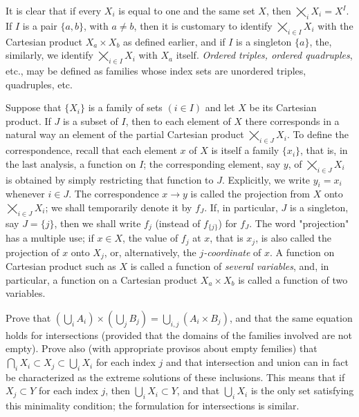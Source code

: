 It is clear that if every $X_{i}$ is equal to one and the same set $X$, then $\bigtimes_{i}X_{i} = X^{I}$. If $I$ is a pair $\{ a,b \}$, with $a \neq b$, then it is customary to identify $\bigtimes_{i \in I}X_{i}$ with the Cartesian product $X_{a} \times X_{b}$ as defined earlier, and if $I$ is a singleton $\{ a \}$, the, similarly, we identify $\bigtimes_{i \in I}X_{i}$ with $X_{a}$ itself. \textit{Ordered triples, ordered quadruples}, etc., may be defined as families whose index sets are unordered triples, quadruples, etc. 

Suppose that $\{ X_{i} \}$ is a family of sets $(i \in I)$ and let $X$ be its Cartesian product. If $J$ is a subset of $I$, then to each element of $X$ there corresponds in a natural way an element of the partial Cartesian product $\bigtimes_{i \in J}X_{i}$. To define the correspondence, recall that each element $x$ of $X$ is itself a family $\{ x_{i} \}$, that is, in the last analysis, a function on $I$; the corresponding element, say $y$, of $\bigtimes_{i \in J}X_{i}$ is obtained by simply restricting that function to $J$. Explicitly, we write $y_{i} = x_{i}$ whenever $i \in J$. The correspondence $x \rightarrow y$ is called the projection from $X$ onto $\bigtimes_{i \in J}X_{i}$; we shall temporarily denote it by $f_{J}$. If, in particular, $J$ is a singleton, say $J = \{ j \}$, then we shall write $f_{j}$ (instead of $f_{ \{j \} }$) for $f_{J}$. The word "projection" has a multiple use; if $x \in X$, the value of $f_{j}$ at $x$, that is $x_{j}$, is also called the projection of $x$ onto $X_{j}$, or, alternatively, the \textit{$j$-coordinate} of $x$. A function on Cartesian product such as $X$ is called a function of \textit{several variables}, and, in particular, a function on a Cartesian product $X_{a} \times X_{b}$ is called a function of two variables. 

\begin{exercise} Prove that $(\bigcup_{i}A_{i}) \times (\bigcup_{j}B_{j}) = \bigcup_{i,j}(A_{i} \times B_{j})$, and that the same equation holds for intersections (provided that the domains of the families involved are not empty). Prove also (with appropriate provisos about empty femilies) that $\bigcap_{i}X_{i} \subset X_{j} \subset \bigcup_{i}X_{i}$ for each index $j$ and that intersection and union can in fact be characterized as the extreme solutions of these inclusions. This means that if $X_{j} \subset Y$ for each index $j$, then $\bigcup_{i}X_{i} \subset Y$, and that $\bigcup_{i}X_{i}$ is the only set satisfying this minimality condition; the formulation for intersections is similar.
\end{exercise}